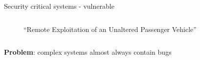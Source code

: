 \documentclass[xcolor={x11names}]{beamer}
\begin{document}
\begin{frame}{Security critical systems - vulnerable}
\begin{columns}
\begin{column}{0.5\textwidth}
\begin{figure}
                \caption{``Remote Exploitation of an Unaltered Passenger Vehicle'' \cite{greenberg_hackers_2015,miller_remote_2015}}
                \label{jeep_offroad}
            \end{figure}
        \end{column}
    \end{columns}
    \pause
    \bigskip
    \textbf{Problem}: complex systems almost always contain bugs
\end{frame}


\end{document}
